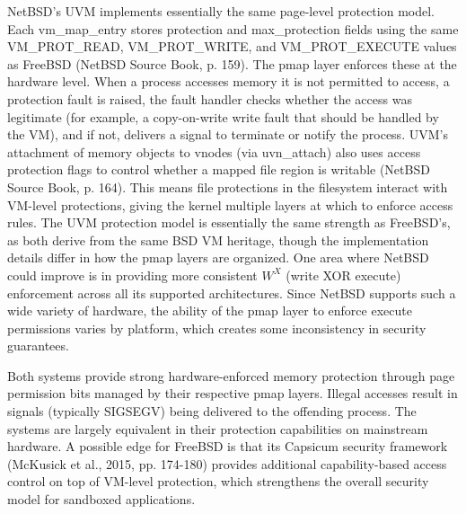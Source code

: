 NetBSD's UVM implements essentially the same page-level protection model. Each vm\_map\_entry stores protection and max\_protection fields using the same VM\_PROT\_READ, VM\_PROT\_WRITE, and VM\_PROT\_EXECUTE values as FreeBSD (NetBSD Source Book, p. 159). The pmap layer enforces these at the hardware level. When a process accesses memory it is not permitted to access, a protection fault is raised, the fault handler checks whether the access was legitimate (for example, a copy-on-write write fault that should be handled by the VM), and if not, delivers a signal to terminate or notify the process.
UVM's attachment of memory objects to vnodes (via uvn\_attach) also uses access protection flags to control whether a mapped file region is writable (NetBSD Source Book, p. 164). This means file protections in the filesystem interact with VM-level protections, giving the kernel multiple layers at which to enforce access rules. The UVM protection model is essentially the same strength as FreeBSD's, as both derive from the same BSD VM heritage, though the implementation details differ in how the pmap layers are organized.
One area where NetBSD could improve is in providing more consistent $W^X$ (write XOR execute) enforcement across all its supported architectures. Since NetBSD supports such a wide variety of hardware, the ability of the pmap layer to enforce execute permissions varies by platform, which creates some inconsistency in security guarantees.

Both systems provide strong hardware-enforced memory protection through page permission bits managed by their respective pmap layers. Illegal accesses result in signals (typically SIGSEGV) being delivered to the offending process. The systems are largely equivalent in their protection capabilities on mainstream hardware. A possible edge for FreeBSD is that its Capsicum security framework (McKusick et al., 2015, pp. 174-180) provides additional capability-based access control on top of VM-level protection, which strengthens the overall security model for sandboxed applications.

